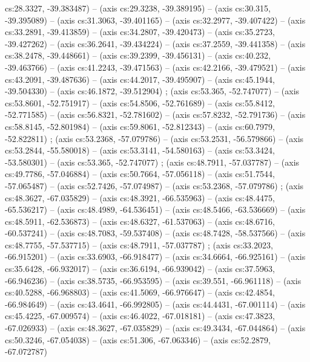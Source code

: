   cs:28.3327, -39.383487) -- (axis cs:29.3238, -39.389195) -- (axis cs:30.315,
  -39.395089) -- (axis cs:31.3063, -39.401165) -- (axis cs:32.2977,
  -39.407422) -- (axis cs:33.2891, -39.413859) -- (axis cs:34.2807,
  -39.420473) -- (axis cs:35.2723, -39.427262) -- (axis cs:36.2641,
  -39.434224) -- (axis cs:37.2559, -39.441358) -- (axis cs:38.2478,
  -39.448661) -- (axis cs:39.2399, -39.456131) -- (axis cs:40.232, -39.463766)
  -- (axis cs:41.2243, -39.471563) -- (axis cs:42.2166, -39.479521) -- (axis
  cs:43.2091, -39.487636) -- (axis cs:44.2017, -39.495907) -- (axis
  cs:45.1944, -39.504330) -- (axis cs:46.1872, -39.512904)
  ;  (axis cs:53.365, -52.747077) -- (axis
  cs:53.8601, -52.751917) -- (axis cs:54.8506, -52.761689) -- (axis
  cs:55.8412, -52.771585) -- (axis cs:56.8321, -52.781602) -- (axis
  cs:57.8232, -52.791736) -- (axis cs:58.8145, -52.801984) -- (axis
  cs:59.8061, -52.812343) -- (axis cs:60.7979, -52.822811)
  ;  (axis cs:53.2368, -57.079786) -- (axis
  cs:53.2531, -56.579866) -- (axis cs:53.2844, -55.580018) -- (axis
  cs:53.3141, -54.580163) -- (axis cs:53.3424, -53.580301) -- (axis cs:53.365,
  -52.747077) ;  (axis cs:48.7911, -57.037787) --
  (axis cs:49.7786, -57.046884) -- (axis cs:50.7664, -57.056118) -- (axis
  cs:51.7544, -57.065487) -- (axis cs:52.7426, -57.074987) -- (axis
  cs:53.2368, -57.079786) ;  (axis cs:48.3627,
  -67.035829) -- (axis cs:48.3921, -66.535963) -- (axis cs:48.4475,
  -65.536217) -- (axis cs:48.4989, -64.536451) -- (axis cs:48.5466,
  -63.536669) -- (axis cs:48.5911, -62.536873) -- (axis cs:48.6327,
  -61.537063) -- (axis cs:48.6716, -60.537241) -- (axis cs:48.7083,
  -59.537408) -- (axis cs:48.7428, -58.537566) -- (axis cs:48.7755,
  -57.537715) -- (axis cs:48.7911, -57.037787) ; 
  (axis cs:33.2023, -66.915201) -- (axis cs:33.6903, -66.918477) -- (axis
  cs:34.6664, -66.925161) -- (axis cs:35.6428, -66.932017) -- (axis
  cs:36.6194, -66.939042) -- (axis cs:37.5963, -66.946236) -- (axis
  cs:38.5735, -66.953595) -- (axis cs:39.551, -66.961118) -- (axis cs:40.5288,
  -66.968803) -- (axis cs:41.5069, -66.976647) -- (axis cs:42.4854,
  -66.984649) -- (axis cs:43.4641, -66.992805) -- (axis cs:44.4431,
  -67.001114) -- (axis cs:45.4225, -67.009574) -- (axis cs:46.4022,
  -67.018181) -- (axis cs:47.3823, -67.026933) -- (axis cs:48.3627,
  -67.035829) -- (axis cs:49.3434, -67.044864) -- (axis cs:50.3246,
  -67.054038) -- (axis cs:51.306, -67.063346) -- (axis cs:52.2879, -67.072787)
